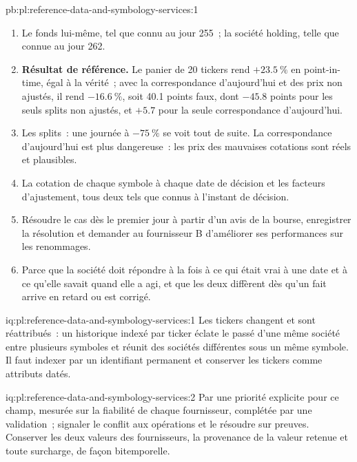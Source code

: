 \begin{solution}{pb:pl:reference-data-and-symbology-services:1}
\begin{enumerate}
\item Le fonds lui-même, tel que connu au jour 255~; la société holding, telle que connue au jour 262.
\item \textbf{Résultat de référence.} Le panier de 20 tickers rend $+23.5~\%$ en point-in-time, égal à la vérité~; avec la correspondance d'aujourd'hui et des prix non ajustés, il rend
$-16.6~\%$, soit 40.1 points faux, dont $-45.8$ points pour les seuls splits non ajustés, et
$+5.7$ pour la seule correspondance d'aujourd'hui.
\item Les splits~: une journée à $-75~\%$ se voit tout de suite. La correspondance d'aujourd'hui est plus dangereuse~: les prix des mauvaises cotations sont réels et
plausibles.
\item La cotation de chaque symbole à chaque date de décision et les facteurs d'ajustement, tous deux tels que connus à l'instant de décision.
\item Résoudre le cas dès le premier jour à partir d'un avis de la bourse, enregistrer la résolution et demander au fournisseur B d'améliorer
ses performances sur les renommages.
\item Parce que la société doit répondre à la fois à ce qui était vrai à une date et à ce qu'elle savait quand elle a agi, et que les deux diffèrent dès qu'un fait arrive
en retard ou est corrigé.
\end{enumerate}
\end{solution}

\begin{solution}{iq:pl:reference-data-and-symbology-services:1}
Les tickers changent et sont réattribués~: un historique indexé par ticker éclate le passé d'une même société entre plusieurs symboles et réunit des sociétés différentes
sous un même symbole. Il faut indexer par un identifiant permanent et conserver les tickers comme attributs datés.
\end{solution}

\begin{solution}{iq:pl:reference-data-and-symbology-services:2}
Par une priorité explicite pour ce champ, mesurée sur la fiabilité de chaque fournisseur, complétée par une validation~; signaler le conflit aux opérations et
le résoudre sur preuves. Conserver les deux valeurs des fournisseurs, la provenance de la valeur retenue et toute surcharge, de façon bitemporelle.
\end{solution}

